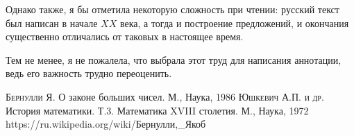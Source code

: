 \documentclass[12pt]{extarticle}
\begin{document}
Однако также, я бы отметила некоторую сложность при чтении: русский текст был написан в начале $XX$ века, а тогда и построение предложений, и окончания существенно отличались от таковых в настоящее время.

Тем не менее, я не пожалела, что выбрала этот труд для написания аннотации, ведь его важность трудно переоценить.
 
\newpage
\begin{thebibliography}{99}
 \textsc{Бернулли Я.} О законе больших чисел. М., Наука, 1986
 \textsc{Юшкевич А.П. и др.} История математики. Т.3. Математика XVIII столетия. М., Наука, 1972
 https://ru.wikipedia.org/wiki/Бернулли,\_Якоб 

\end{thebibliography}
\end{document}
